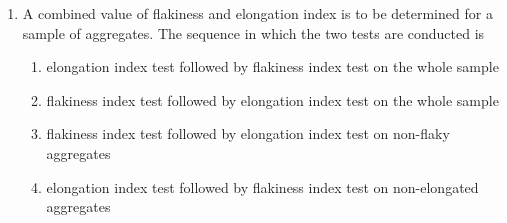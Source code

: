 \documentclass[journal,12pt,onecolumn]{IEEEtran}
\theoremstyle{remark}
\begin{document}
\begin{enumerate}
\item A combined value of flakiness and elongation index is to be determined for a sample of aggregates. The sequence in which the two tests are conducted is

\begin{enumerate}
	\item elongation index test followed by flakiness index test on the whole sample
	\item flakiness index test followed by elongation index test on the whole sample
	\item flakiness index test followed by elongation index test on non-flaky aggregates
	\item elongation index test followed by flakiness index test on non-elongated aggregates
\end{enumerate}

\end{enumerate}
\end{document}
